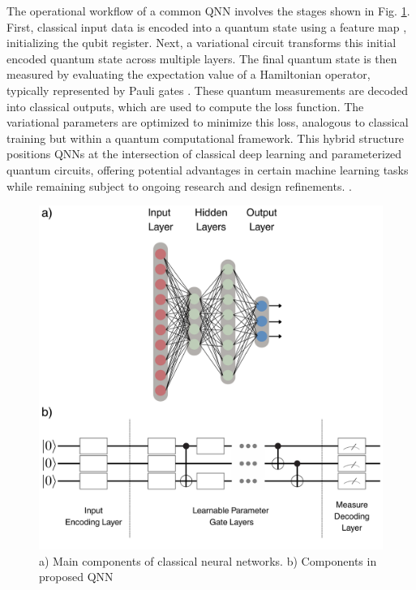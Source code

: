 \documentclass{article}
\begin{document}
The operational workflow of a common QNN involves the stages shown in Fig. \ref{fig:qnn1}. First, classical input data is encoded into a quantum state using a feature map \cite{kwon2024featuremapquantumdata}, initializing the qubit register. Next, a variational circuit transforms this initial encoded quantum state across multiple layers. The final quantum state is then measured by evaluating the expectation value of a Hamiltonian operator, typically represented by Pauli gates \cite{farhi2018classificationquantumneuralnetworks}. These quantum measurements are decoded into classical outputs, which are used to compute the loss function. The variational parameters are optimized to minimize this loss, analogous to classical training but within a quantum computational framework. This hybrid structure positions QNNs at the intersection of classical deep learning and parameterized quantum circuits, offering potential advantages in certain machine learning tasks while remaining subject to ongoing research and design refinements. \cite{qiskittheory}.

\begin{figure}[h]
    \centering
    \includegraphics[scale=0.15]{figures/nns.png}
    \caption{a) Main components of classical neural networks. b) Components in proposed QNN}
    \label{fig:qnn1}
\end{figure}
\end{document}
